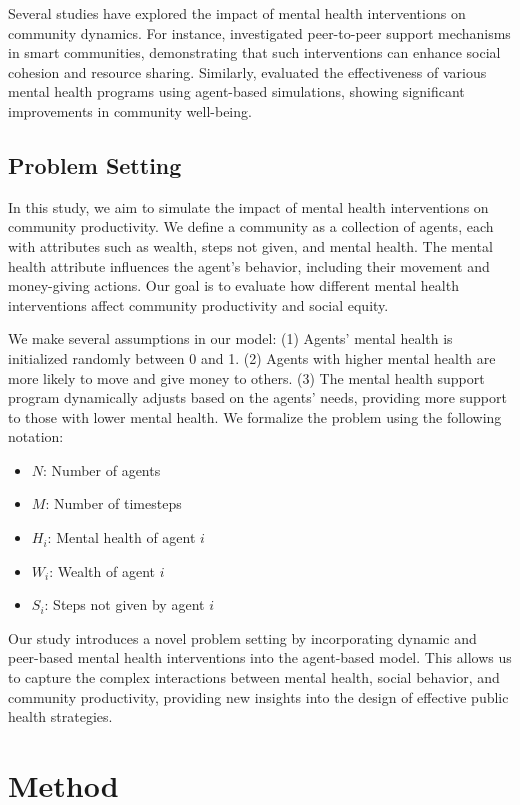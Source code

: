 \documentclass{article} %
\begin{document}
Several studies have explored the impact of mental health interventions on community dynamics. For instance, \citet{zhou2023peer} investigated peer-to-peer support mechanisms in smart communities, demonstrating that such interventions can enhance social cohesion and resource sharing. Similarly, \citet{liu2023agentbench} evaluated the effectiveness of various mental health programs using agent-based simulations, showing significant improvements in community well-being.

\subsection{Problem Setting}
\label{sec:problem_setting}

In this study, we aim to simulate the impact of mental health interventions on community productivity. We define a community as a collection of agents, each with attributes such as wealth, steps not given, and mental health. The mental health attribute influences the agent's behavior, including their movement and money-giving actions. Our goal is to evaluate how different mental health interventions affect community productivity and social equity.

We make several assumptions in our model: (1) Agents' mental health is initialized randomly between 0 and 1. (2) Agents with higher mental health are more likely to move and give money to others. (3) The mental health support program dynamically adjusts based on the agents' needs, providing more support to those with lower mental health. We formalize the problem using the following notation:
\begin{itemize}
    \item $N$: Number of agents
    \item $M$: Number of timesteps
    \item $H_i$: Mental health of agent $i$
    \item $W_i$: Wealth of agent $i$
    \item $S_i$: Steps not given by agent $i$
\end{itemize}

Our study introduces a novel problem setting by incorporating dynamic and peer-based mental health interventions into the agent-based model. This allows us to capture the complex interactions between mental health, social behavior, and community productivity, providing new insights into the design of effective public health strategies.

\section{Method}
\label{sec:method}
\end{document}
